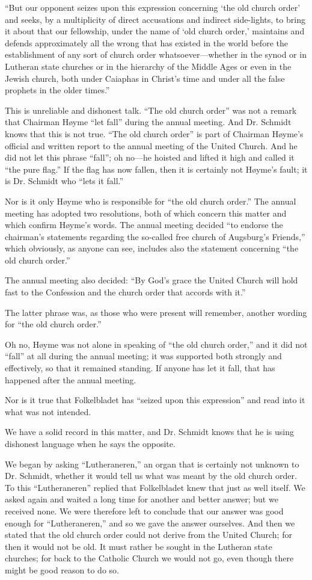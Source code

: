 “But our opponent seizes upon this expression concerning ‘the old church order’ and seeks, by a multiplicity of direct accusations and indirect side-lights, to bring it about that our fellowship, under the name of ‘old church order,’ maintains and defends approximately all the wrong that has existed in the world before the establishment of any sort of church order whatsoever—whether in the synod or in Lutheran state churches or in the hierarchy of the Middle Ages or even in the Jewish church, both under Caiaphas in Christ’s time and under all the false prophets in the older times.”


This is unreliable and dishonest talk. “The old church order” was not a remark that Chairman Høyme “let fall” during the annual meeting. And Dr. Schmidt knows that this is not true. “The old church order” is part of Chairman Høyme’s official and written report to the annual meeting of the United Church. And he did not let this phrase “fall”; oh no—he hoisted and lifted it high and called it “the pure flag.” If the flag has now fallen, then it is certainly not Høyme’s fault; it is Dr. Schmidt who “lets it fall.”

Nor is it only Høyme who is responsible for “the old church order.” The annual meeting has adopted two resolutions, both of which concern this matter and which confirm Høyme’s words. The annual meeting decided “to endorse the chairman’s statements regarding the so‑called free church of Augsburg’s Friends,” which obviously, as anyone can see, includes also the statement concerning “the old church order.”

The annual meeting also decided: “By God’s grace the United Church will hold fast to the Confession and the church order that accords with it.”

The latter phrase was, as those who were present will remember, another wording for “the old church order.”

Oh no, Høyme was not alone in speaking of “the old church order,” and it did not “fall” at all during the annual meeting; it was supported both strongly and effectively, so that it remained standing. If anyone has let it fall, that has happened after the annual meeting.

Nor is it true that Folkelbladet has “seized upon this expression” and read into it what was not intended.

We have a solid record in this matter, and Dr. Schmidt knows that he is using dishonest language when he says the opposite.

We began by asking “Lutheraneren,” an organ that is certainly not unknown to Dr. Schmidt, whether it would tell us what was meant by the old church order. To this “Lutheraneren” replied that Folkelbladet knew that just as well itself. We asked again and waited a long time for another and better answer; but we received none. We were therefore left to conclude that our answer was good enough for “Lutheraneren,” and so we gave the answer ourselves. And then we stated that the old church order could not derive from the United Church; for then it would not be old. It must rather be sought in the Lutheran state churches; for back to the Catholic Church we would not go, even though there might be good reason to do so.


